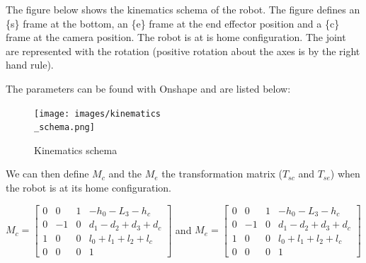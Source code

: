 \bigbreak

The figure below shows the kinematics schema of the robot. The figure defines an \{s\} frame at the bottom, an \{e\} frame at the end effector position and a \{c\} frame at the camera position. The robot is at is home configuration. The joint are represented with the rotation (positive rotation about the axes is by the right hand rule).

\bigbreak 

The parameters can be found with Onshape and are listed below: 

\begin{center}
\end{center}

\begin{figure}[ht]
    \centering
    \texttt{[image: images/kinematics\\\_schema.png]}
    \caption{Kinematics schema}
    \label{fig:mesh10}
\end{figure}
\FloatBarrier

\bigbreak

We can then define $M_c$ and the $M_e$ the transformation matrix ($T_{sc}$ and $T_{se}$) when the robot is at its home configuration. 

\bigbreak
\begin{center}
    $
    M_c = \begin{bmatrix}
        0 & 0 & 1 & -h_0-L_3-h_c\\
        0 & -1 & 0 & d_1-d_2+d_3+d_c\\
        1 & 0 & 0 & l_0+l_1+l_2+l_c\\
        0 & 0 & 0 & 1
    \end{bmatrix}
    $
    and
    $
    M_e = \begin{bmatrix}
        0 & 0 & 1 & -h_0-L_3-h_c\\
        0 & -1 & 0 & d_1-d_2+d_3+d_c\\
        1 & 0 & 0 & l_0+l_1+l_2+l_c\\
        0 & 0 & 0 & 1
    \end{bmatrix}
    $
\end{center}


